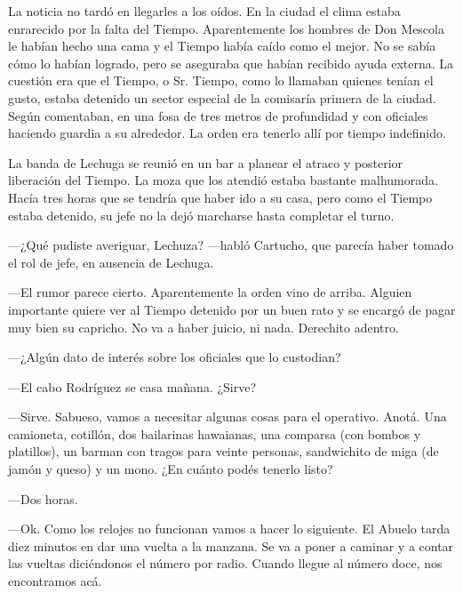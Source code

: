 \documentclass[11pt,twoside,openright,a5paper]{book}
\begin{document}
La noticia no tardó en llegarles a los oídos. En la ciudad el clima estaba enrarecido por la falta del Tiempo. Aparentemente los hombres de Don Mescola le habían hecho una cama y el Tiempo había caído como el mejor. No se sabía cómo lo habían logrado, pero se aseguraba que habían recibido ayuda externa. La cuestión era que el Tiempo, o Sr. Tiempo, como lo llamaban quienes tenían el gusto, estaba detenido un sector especial de la comisaría primera de la ciudad. Según comentaban, en una fosa de tres metros de profundidad y con oficiales haciendo guardia a su alrededor. La orden era tenerlo allí por tiempo indefinido.

\vspace{0.5cm}

La banda de Lechuga se reunió en un bar a planear el atraco y posterior liberación del Tiempo. La moza que los atendió estaba bastante malhumorada. Hacía tres horas que se tendría que haber ido a su casa, pero como el Tiempo estaba detenido, su jefe no la dejó marcharse hasta completar el turno.

---¿Qué pudiste averiguar, Lechuza? ---habló Cartucho, que parecía haber tomado el rol de jefe, en ausencia de Lechuga.

---El rumor parece cierto. Aparentemente la orden vino de arriba. Alguien importante quiere ver al Tiempo detenido por un buen rato y se encargó de pagar muy bien su capricho. No va a haber juicio, ni nada. Derechito adentro.

---¿Algún dato de interés sobre los oficiales que lo custodian?

---El cabo Rodríguez se casa mañana. ¿Sirve?

---Sirve. Sabueso, vamos a necesitar algunas cosas para el operativo. Anotá. Una camioneta, cotillón, dos bailarinas hawaianas, una comparsa (con bombos y platillos), un barman con tragos para veinte personas,  sandwichito de miga (de jamón y queso) y un mono. ¿En cuánto podés tenerlo listo?

---Dos horas.

---Ok. Como los relojes no funcionan vamos a hacer lo siguiente. El Abuelo tarda diez  minutos en dar una vuelta a la manzana. Se va a poner a caminar y a contar las vueltas diciéndonos el número por radio. Cuando llegue al número doce, nos encontramos acá.

\vspace{0.5cm}
\end{document}
